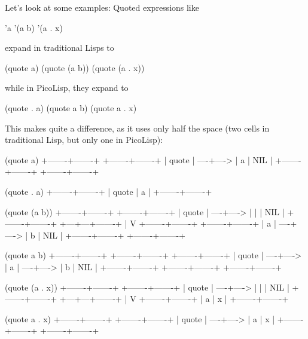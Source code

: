 Let's look at some examples: Quoted expressions like
\begin{wideverbatim}
   'a
   '(a b)
   '(a . x)
\end{wideverbatim}

expand in traditional Lisps to
\begin{wideverbatim}
   (quote a)
   (quote (a b))
   (quote (a . x))
\end{wideverbatim}

while in PicoLisp, they expand to
\begin{wideverbatim}
   (quote . a)
   (quote a b)
   (quote a . x)
\end{wideverbatim}

This makes quite a difference, as it uses only half the space (two cells in
traditional Lisp, but only one in PicoLisp):
\begin{wideverbatim}
   (quote a)
      +-------+-------+      +-------+-------+
      | quote |   ----+----> |   a   |  NIL  |
      +-------+-------+      +-------+-------+

   (quote . a)
      +-------+-------+
      | quote |   a   |
      +-------+-------+
\end{wideverbatim}

\begin{wideverbatim}
   (quote (a b))
      +-------+-------+      +-------+-------+
      | quote |   ----+----> |   |   |  NIL  |
      +-------+-------+      +---+---+-------+
                                 |
                                 V
                             +-------+-------+      +-------+-------+
                             |   a   |   ----+----> |   b   |  NIL  |
                             +-------+-------+      +-------+-------+

   (quote a b)
      +-------+-------+      +-------+-------+      +-------+-------+
      | quote |   ----+----> |   a   |   ----+----> |   b   |  NIL  |
      +-------+-------+      +-------+-------+      +-------+-------+
\end{wideverbatim}

\begin{wideverbatim}
   (quote (a . x))
      +-------+-------+      +-------+-------+
      | quote |   ----+----> |   |   |  NIL  |
      +-------+-------+      +---+---+-------+
                                 |
                                 V
                             +-------+-------+
                             |   a   |   x   |
                             +-------+-------+

   (quote a . x)
      +-------+-------+      +-------+-------+
      | quote |   ----+----> |   a   |   x   |
      +-------+-------+      +-------+-------+
\end{wideverbatim}

